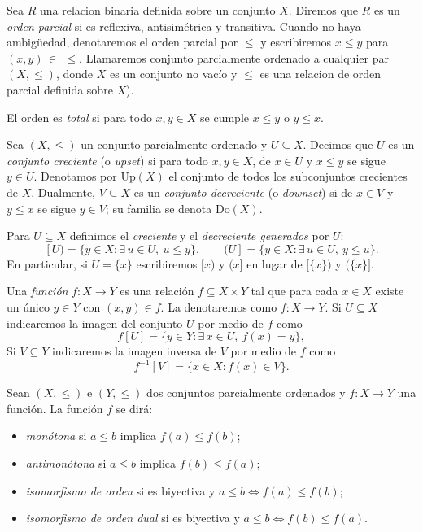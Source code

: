 \documentclass[12pt]{book}
\newcommand{\Do}{\mathrm{Do}}
\begin{document}
\medskip

Sea $R$ una relacion binaria definida sobre un conjunto $X$. Diremos que $R$ es un \emph{orden parcial} si es reflexiva, antisimétrica y transitiva. Cuando no haya ambigüedad, denotaremos el orden parcial por \( \leq \) y escribiremos \( x \leq y \) para \( (x,y)\, \in \,\ \leq \).
Llamaremos conjunto parcialmente ordenado a cualquier par \( (X,\leq) \), donde $X$ es un conjunto no vacío y $\leq$ es una relacion de orden parcial definida sobre $X$).

El orden es \emph{total} si para todo \( x,y \in X \) se cumple \( x \le y \) o \( y \le x \).

\medskip

Sea \( (X,\leq) \) un conjunto parcialmente ordenado y \( U \subseteq X \).
Decimos que \( U \) es un \emph{conjunto creciente} (o \emph{upset}) si
para todo \( x,y \in X \), de \( x \in U \) y \( x \le y \) se sigue \( y \in U \).
Denotamos por  $\mathrm{Up}(X)$  el conjunto de todos los subconjuntos crecientes de \( X \).
Dualmente, \( V \subseteq X \) es un \emph{conjunto decreciente} (o \emph{downset}) si
de \( x \in V \) y \( y \le x \) se sigue \( y \in V \); su familia se denota \( \Do(X) \).

Para \( U \subseteq X \) definimos el \emph{creciente} y el \emph{decreciente generados} por \( U \):
\[
[U) = \{ y \in X : \exists\, u \in U,\ u \le y \},
\qquad
(U] = \{ y \in X : \exists\, u \in U,\ y \le u \}.
\]
 En particular, si $U = \{x\}$ escribiremos $[x)$ y $(x]$ en lugar de $[\{x\})$ y $(\{x\}]$.

\medskip

Una \emph{función} \( f \colon X \to Y \) es una relación \( f \subseteq X \times Y \)
tal que para cada \( x \in X \) existe un único \( y \in Y \) con \( (x,y) \in f \). La denotaremos como \( f \colon X \to Y \). Si \( U \subseteq X \) indicaremos la imagen del conjunto \( U \) por medio de \( f \) como 
\[
f[U] = \{ y \in Y : \exists\, x \in U,\ f(x) = y \},
\]
Si \( V \subseteq Y \) indicaremos la imagen inversa de \( V \) por medio de \( f \) como
\[
f^{-1}[V] = \{ x \in X : f(x) \in V \}.
\]

Sean \( (X,\leq) \) e \( (Y,\leq) \) dos conjuntos parcialmente ordenados y
\( f \colon X \to Y \) una función. La función $f$ se dirá:
\begin{itemize}
  \item \emph{monótona} si \( a \le b \) implica \( f(a) \le f(b) \);
  \item \emph{antimonótona}  si \( a \le b \) implica \( f(b) \le f(a) \);
  \item \emph{isomorfismo de orden} si es biyectiva y \( a \le b \iff f(a) \le f(b) \);
  \item \emph{isomorfismo de orden dual} si es biyectiva y \( a \le b \iff f(b) \le f(a) \).
\end{itemize}
\end{document}
